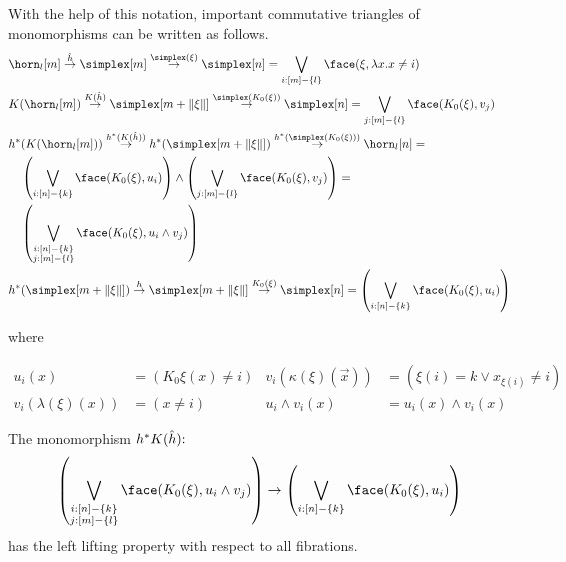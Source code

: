 \documentclass[csh.tex]{subfiles}
\begin{document}
With the help of this notation, important commutative triangles of monomorphisms can be written as follows.
\begin{align}
&\horn_l[m]\stackrel{\hat h}\to \simplex[m]\stackrel{\simplex(\xi)}\to \simplex[n] = \bigvee_{i\of [m]-\set l} \face(\xi,\function x{x\neq i})\\
&K(\horn_l[m])\stackrel{K(\hat h)}\to \simplex[m+\norm\xi]\stackrel{\simplex(K_0(\xi))}\to \simplex[n] = \bigvee_{j\of [m]-\set l} \face(K_0(\xi),v_j)\\
&h\ri(K(\horn_l[m]))\stackrel{h\ri(K(\hat h))}\to h\ri(\simplex[m+\norm\xi])\stackrel{h\ri(\simplex(K_0(\xi)))}\to \horn_l[n] = \\
&\quad\left(\bigvee_{i\of[n]-\set k} \face(K_0(\xi),u_i)\right)\wedge\left(\bigvee_{j\of [m]-\set l} \face(K_0(\xi),v_j)\right)=\\
&\quad\left(\bigvee_{\substack{i\of[n]-\set k\\j\of [m]-\set l}}\face(K_0(\xi),u_i\land v_j)\right)\\
&h\ri(\simplex[m+\norm\xi])\stackrel{h}\to \simplex[m+\norm\xi]\stackrel{K_0(\xi)}\to \simplex[n] =\left(\bigvee_{i\of[n]-\set k} \face(K_0(\xi),u_i)\right)
\end{align}
\begin{center}
where
\end{center}
\begin{align*}
u_i(x) &= (K_0\xi(x)\neq i) & 
v_i(\kappa(\xi)(\vec x)) &= (\xi(i)= k\vee x_{\xi(i)}\neq i)\\
v_i(\lambda(\xi)(x)) &= (x\neq i)&
u_i\land v_i(x) &= u_i(x)\land v_i(x)
\end{align*}


\begin{lemma} The monomorphism $h^* K(\hat h)\mathord :$
\[ \left(\bigvee_{\substack{i\of[n]-\set{k}\\j\of [m]-\set l}}\face(K_0(\xi),u_i\land v_j)\right)\to\left(\bigvee_{i\of[n]-\set{k}} \face(K_0(\xi),u_i)\right) \] 
has the left lifting property with respect to all fibrations.\label{left lifting property}\end{lemma}
\end{document}
